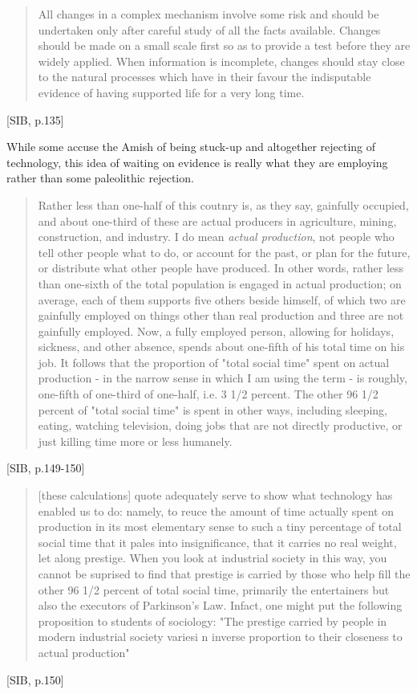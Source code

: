 \begin{quote}
  All changes in a complex mechanism involve some risk and should be undertaken only after careful study of all the facts available. Changes should be made on a small scale first so as to provide a test before they are widely applied. When information is incomplete, changes should stay close to the natural processes which have in their favour the indisputable evidence of having supported life for a very long time.
\end{quote}[SIB, p.135]

While some accuse the Amish of being stuck-up and altogether rejecting of technology, this idea of waiting on evidence is really what they are employing rather than some paleolithic rejection.

\begin{quote}
  Rather less than one-half of this coutnry is, as they say, gainfully occupied, and about one-third of these are actual producers in agriculture, mining, construction, and industry. I do mean \textit{actual production}, not people who tell other people what to do, or account for the past, or plan for the future, or distribute what other people have produced. In other words, rather less than one-sixth of the total population is engaged in actual production; on average, each of them supports five others beside himself, of which two are gainfully employed on things other than real production and three are not gainfully employed. Now, a fully employed person, allowing for holidays, sickness, and other absence, spends about one-fifth of his total time on his job. It follows that the proportion of "total social time" spent on actual production - in the narrow sense in which I am using the term - is roughly, one-fifth of one-third of one-half, i.e. 3 1/2 percent. The other 96 1/2 percent of "total social time" is spent in other ways, including sleeping, eating, watching television, doing jobs that are not directly productive, or just killing time more or less humanely.
\end{quote} [SIB, p.149-150]

\begin{quote}
  [these calculations] quote adequately serve to show what technology has enabled us to do: namely, to reuce the amount of time actually spent on production in its most elementary sense to such a tiny percentage of total social time that it pales into insignificance, that it carries no real weight, let along prestige. When you look at industrial society in this way, you cannot be suprised to find that prestige is carried by those who help fill the other 96 1/2 percent of total social time, primarily the entertainers but also the executors of Parkinson's Law. Infact, one might put the following proposition to students of sociology: "The prestige carried by people in modern industrial society variesi n inverse proportion to their closeness to actual production"
\end{quote} [SIB, p.150]

